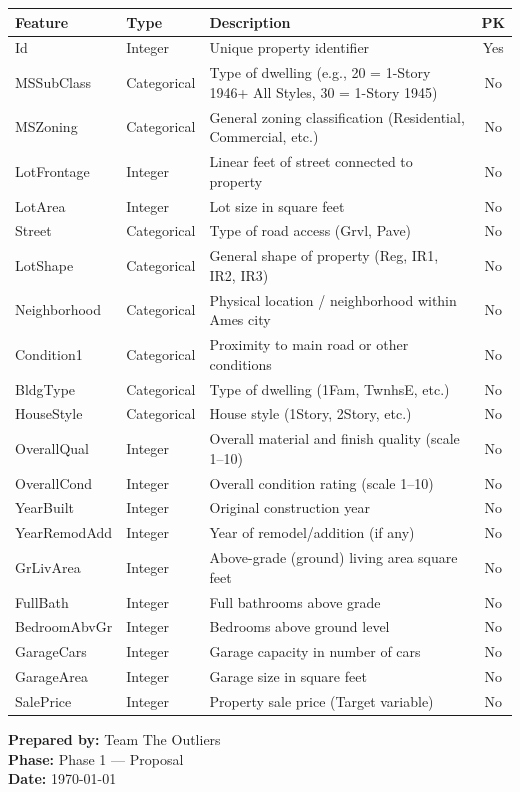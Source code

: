 \documentclass[12pt,a4paper]{article}
\begin{document}
\begin{tabular}{|l|l|p{8cm}|c|}
\hline
\textbf{Feature} & \textbf{Type} & \textbf{Description} & \textbf{PK} \\
\hline
Id & Integer & Unique property identifier & Yes \\
\hline
MSSubClass & Categorical & Type of dwelling (e.g., 20 = 1-Story 1946+ All Styles, 30 = 1-Story 1945) & No \\
\hline
MSZoning & Categorical & General zoning classification (Residential, Commercial, etc.) & No \\
\hline
LotFrontage & Integer & Linear feet of street connected to property & No \\
\hline
LotArea & Integer & Lot size in square feet & No \\
\hline
Street & Categorical & Type of road access (Grvl, Pave) & No \\
\hline
LotShape & Categorical & General shape of property (Reg, IR1, IR2, IR3) & No \\
\hline
Neighborhood & Categorical & Physical location / neighborhood within Ames city & No \\
\hline
Condition1 & Categorical & Proximity to main road or other conditions & No \\
\hline
BldgType & Categorical & Type of dwelling (1Fam, TwnhsE, etc.) & No \\
\hline
HouseStyle & Categorical & House style (1Story, 2Story, etc.) & No \\
\hline
OverallQual & Integer & Overall material and finish quality (scale 1–10) & No \\
\hline
OverallCond & Integer & Overall condition rating (scale 1–10) & No \\
\hline
YearBuilt & Integer & Original construction year & No \\
\hline
YearRemodAdd & Integer & Year of remodel/addition (if any) & No \\
\hline
GrLivArea & Integer & Above-grade (ground) living area square feet & No \\
\hline
FullBath & Integer & Full bathrooms above grade & No \\
\hline
BedroomAbvGr & Integer & Bedrooms above ground level & No \\
\hline
GarageCars & Integer & Garage capacity in number of cars & No \\
\hline
GarageArea & Integer & Garage size in square feet & No \\
\hline
SalePrice & Integer & Property sale price (Target variable) & No \\
\hline
\end{tabular}


\bigskip

\noindent \textbf{Prepared by:} Team The Outliers \\
\textbf{Phase:} Phase 1 — Proposal \\
\textbf{Date:} \today
\end{document}

